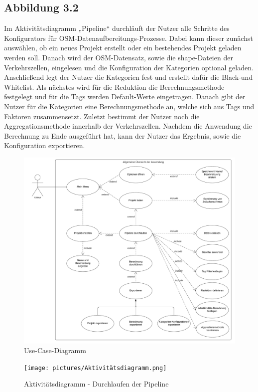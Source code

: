 \documentclass[parskip=full]{scrartcl} %
\begin{document}
\subsection{Abbildung 3.2}
Im Aktivitätsdiagramm „Pipeline“ durchläuft der Nutzer alle Schritte des Konfigurators für OSM-Datenaufbereitungs-Prozesse. Dabei kann dieser zunächst auswählen, ob ein neues Projekt erstellt oder ein bestehendes Projekt geladen werden soll. Danach wird der OSM-Datensatz, sowie die shape-Dateien der Verkehrszellen, eingelesen und die Konfiguration der Kategorien optional geladen. Anschließend legt der Nutzer die Kategorien fest und erstellt dafür die Black-und Whitelist. Als nächstes wird für die Reduktion die Berechnungsmethode festgelegt und für die Tags werden Default-Werte eingetragen. Danach gibt der Nutzer für die Kategorien eine Berechnungsmethode an, welche sich aus Tags und Faktoren zusammensetzt. Zuletzt bestimmt der Nutzer noch die Aggregationsmethode innerhalb der Verkehrszellen. Nachdem die Anwendung die Berechnung zu Ende ausgeführt hat, kann der Nutzer das Ergebnis, sowie die Konfiguration exportieren. 
\begin{figure}
    \centering
    \includegraphics[width=1\textwidth]{pictures/Anwendungsfalldiagramm.png}
    \caption{Use-Case-Diagramm}
\end{figure}

\begin{figure}
    \centering
    \texttt{[image: pictures/Aktivitätsdiagramm.png]}
    \caption{Aktivitätsdiagramm - Durchlaufen der Pipeline}
\end{figure}
\end{document}
